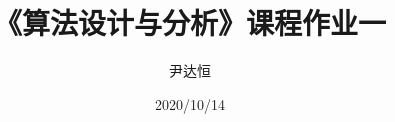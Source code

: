 \documentclass[a4paper]{ctexart}
\title{《算法设计与分析》课程作业一}
\author{尹达恒}
\date{2020/10/14}
\begin{document}
\begin{titlepage}
\maketitle
\end{titlepage}








\end{document}
